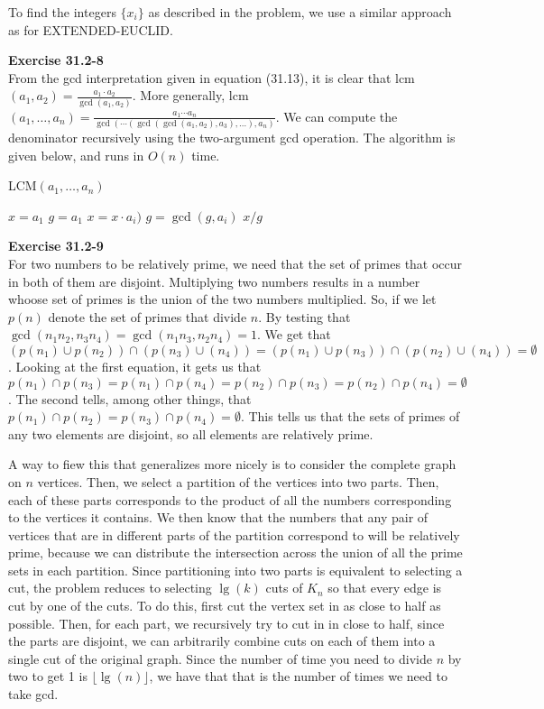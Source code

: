 \documentclass{article}
\begin{document}
To find the integers $\{x_i\}$ as described in the problem, we use a similar approach as for EXTENDED-EUCLID. 

\noindent\textbf{Exercise 31.2-8}\\

From the gcd interpretation given in equation (31.13), it is clear that lcm$(a_1, a_2) = \frac{a_1 \cdot a_2}{\gcd(a_1,a_2)}$.  More generally, lcm$(a_1,\ldots,a_n) = \frac{a_1\cdots a_n}{\gcd( \cdots (\gcd(\gcd(a_1,a_2), a_3), \ldots),a_n)}$. We can compute the denominator recursively using the two-argument gcd operation.  The algorithm is given below, and runs in $O(n)$ time. \\

\begin{algorithm}
\caption{LCM$(a_1,\ldots, a_n)$}
\begin{algorithmic}
\State $x = a_1$
\State $g = a_1$
	\State $x = x \cdot a_i)$
	\State $g = \gcd(g,a_i)$
\EndFor
\State \Return $x/g$
\end{algorithmic}
\end{algorithm}

\noindent\textbf{Exercise 31.2-9}\\

For two numbers to be relatively prime, we need that the set of primes that occur in both of them are disjoint. Multiplying two numbers results in a number whoose set of primes is the union of the two numbers multiplied. So, if we let $p(n)$ denote the set of primes that divide $n$. By testing that $ \gcd(n_1n_2,n_3n_4) = \gcd(n_1n_3, n_2n_4) = 1$. We get that $(p(n_1)\cup p(n_2))\cap(p(n_3)\cup(n_4)) = (p(n_1)\cup p(n_3))\cap(p(n_2)\cup(n_4)) = \emptyset$. Looking at the first equation, it gets us that $p(n_1) \cap p(n_3) = p(n_1) \cap p(n_4)  = p(n_2) \cap p(n_3) = p(n_2) \cap p(n_4) = \emptyset$. The second tells, among other things, that $p(n_1) \cap p(n_2) = p(n_3) \cap p(n_4) = \emptyset$. This tells us that the sets of primes of any two elements are disjoint, so all elements are relatively prime.

 A way to fiew this that generalizes more nicely is to consider the complete graph on $n$ vertices. Then, we select a partition of the vertices into two parts. Then, each of these parts corresponds to the product of all the numbers corresponding to the vertices it contains. We then know that the numbers that any pair of vertices that are in different parts of the partition correspond to will be relatively prime, because we can distribute the intersection across the union of all the prime sets in each partition. Since partitioning into two parts is equivalent to selecting a cut, the problem reduces to selecting $\lg(k)$ cuts of $K_n$ so that every edge is cut by one of the cuts. To do this, first cut the vertex set in as close to half as possible. Then, for each part, we recursively try to cut in in close to half, since the parts are disjoint, we can arbitrarily combine cuts on each of them into a single cut of the original graph. Since the number of time you need to divide $n$ by two to get 1 is $\lfloor\lg(n)\rfloor$, we have that that is the number of times we need to take gcd.\\
\end{document}
